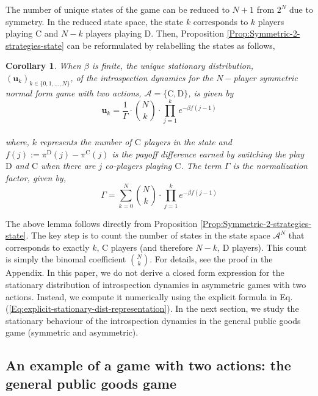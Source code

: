 \documentclass[11pt]{article}
\theoremstyle{plainCl1}
\theoremstyle{plainCl2}
\newtheorem{Corollary}{Corollary}
\newcommand{\ubf}{\mathbf{u}}
\newcommand{\C}{\mathrm{C}}
\newcommand{\D}{\mathrm{D}}
\begin{document}
\noindent The number of unique states of the game can be reduced to $N+1$ from $2^N$ due to symmetry. In the reduced state space, the state $k$ corresponds to $k$ players playing $\C$ and $N-k$ players playing $\D$. Then, Proposition \ref{Prop:Symmetric-2-strategies-state} can be reformulated by relabelling the states as follows,


\begin{Corollary}
\label{Lemma: Symmetric-2-stg}
When $\beta$ is finite, the unique stationary distribution, $(\ubf_k)_{k \in \{0,1,...,N\}}$, of the introspection dynamics for the $N-$player symmetric normal form game with two actions, $\mathcal{A} = \{\C, \D \}$, is given by \\
\begin{equation}
\label{Eq:stationary-dist-symm-2-stgs}
\ubf_k = \frac{1}{\Gamma} \cdot {N \choose k} \cdot \displaystyle \prod_{j=1}^{k} \displaystyle e^{-\beta f(j-1)}
\end{equation} \\ 
where, $k$ represents the number of $\C$ players in the state and $f(j) := \pi^\D(j) - \pi^\C(j)$ is the payoff difference earned by switching the play $\D$ and $\C$ when there are $j$ co-players playing $\C$. The term $\Gamma$ is the normalization factor, given by, \\
\begin{equation}
\label{Eq:normalization-Tk}
\Gamma = \displaystyle \sum_{k=0}^N {N \choose k} \cdot \displaystyle \prod_{j=1}^{k} \displaystyle e^{-\beta f(j-1)}
\end{equation}
\end{Corollary}
\noindent The above lemma follows directly from Proposition \ref{Prop:Symmetric-2-strategies-state}. The key step is to count the number of states in the state space $\mathcal{A}^N$ that corresponds to exactly $k$, $\C$ players (and therefore $N-k$, $\D$ players). This count is simply the binomal coefficient $N \choose k$. For details, see the proof in the Appendix. In this paper, we do not derive a closed form expression for the stationary distribution of introspection dynamics in asymmetric games with two actions. Instead, we compute it numerically using the explicit formula in Eq. (\ref{Eq:explicit-stationary-dist-representation}). In the next section, we study the stationary behaviour of the introspection dynamics in the general public goods game (symmetric and asymmetric).

\subsection*{An example of a  game with two actions: the general public goods game}
\end{document}
